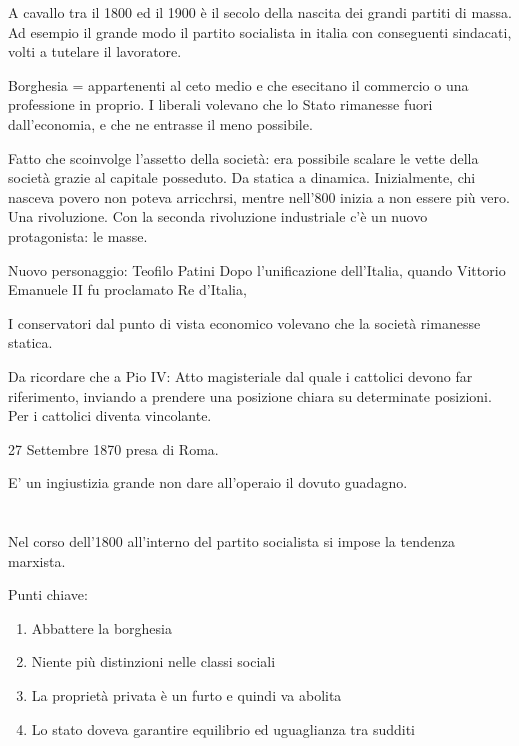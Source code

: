 \documentclass{article}
\begin{document}
    A cavallo tra il 1800 ed il 1900 è il secolo della nascita dei grandi partiti di massa. Ad esempio il grande modo il partito socialista in italia con conseguenti sindacati, volti a tutelare il lavoratore.

    Borghesia = appartenenti al ceto medio e che esecitano il commercio o una professione in proprio. I liberali volevano che lo Stato rimanesse fuori dall'economia, e che ne entrasse il meno possibile.

    Fatto che scoinvolge l'assetto della società: era possibile scalare le vette della società grazie al capitale posseduto. Da statica a dinamica. Inizialmente, chi nasceva povero non poteva arricchrsi, mentre nell'800 inizia a non essere più vero. Una rivoluzione.
    Con la seconda rivoluzione industriale c'è un nuovo protagonista: le masse.

    Nuovo personaggio: Teofilo Patini
    Dopo l'unificazione dell'Italia, quando Vittorio Emanuele II fu proclamato Re d'Italia, 

    I conservatori dal punto di vista economico volevano che la società rimanesse statica.

    Da ricordare che a Pio IV: Atto magisteriale dal quale i cattolici devono far riferimento, inviando a prendere una posizione chiara su determinate posizioni. Per i cattolici diventa vincolante.

    27 Settembre 1870 presa di Roma.

    E' un ingiustizia grande non dare all'operaio il dovuto guadagno.

    \section{}
    Nel corso dell'1800 all'interno del partito socialista si impose la tendenza marxista.

    Punti chiave:

    \begin{enumerate}
        \item Abbattere la borghesia
        \item Niente più distinzioni nelle classi sociali
        \item La proprietà privata è un furto e quindi va abolita
        \item Lo stato doveva garantire equilibrio ed uguaglianza tra sudditi
    \end{enumerate}
\end{document}
